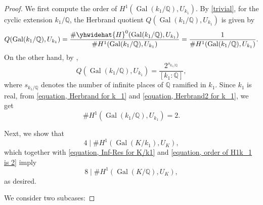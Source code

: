 \documentclass[12pt]{amsart}
\theoremstyle{definition}
\numberwithin{equation}{section}
\DeclareMathOperator{\Gal}{Gal}
\begin{document}
\begin{proof}
	We first compute the order of $H^1(\Gal(k_1/\mathbb{Q}),U_{k_1})$. By \eqref{trivial},  for the cyclic extension $k_1/\mathbb{Q}$,
	the Herbrand quotient $Q(\Gal(k_1/\mathbb{Q}),U_{k_1})$ is given by
	\begin{equation} \label{equation, Herbrand for k_1}
		Q(\Gal(k_1/\mathbb{Q}),U_{k_1})=\frac{\# \yhwidehat{H}^0(\Gal(k_1/\mathbb{Q}),U_{k_1})}{\# H^1(\Gal(k_1/\mathbb{Q}),U_{k_1})}=\frac{1}{\# H^1(\Gal(k_1/\mathbb{Q}),U_{k_1})}.	
	\end{equation}
	On the other hand, by \cite[Proposition 5.10]{NChildress},
	\begin{equation} \label{equation, Herbrand2 for k_1}
		Q(\Gal(k_1/\mathbb{Q}),U_{k_1})=\frac{2^{s_{k_1/\mathbb{Q}}}}{[k_1:\mathbb{Q}]},
	\end{equation}
	where $s_{k_1/\mathbb{Q}}$ denotes the number of infinite places of $\mathbb{Q}$ ramified in $k_1$.
	Since $k_1$ is real, 
	from \eqref{equation, Herbrand for k_1} and \eqref{equation, Herbrand2 for k_1}, we get
	\begin{equation} \label{equation, order of H1k_1 is 2}
		\# H^1(\Gal(k_1/\mathbb{Q}),U_{k_1})=2.
	\end{equation}
	
	Next, we show that   
	\begin{equation}
	\label{four1}
	4 \mid \# H^1(\Gal(K/k_1),U_K),
	\end{equation}
	which together with \eqref{equation, Inf-Res for K/k1} and \eqref{equation, order of H1k_1 is 2} imply 
	\begin{equation*}
		8 \mid \# H^1(\Gal(K/\mathbb{Q}),U_K),
	\end{equation*}
	as desired. 
	
	We consider two subcases:	
	


\end{proof}
\end{document}
